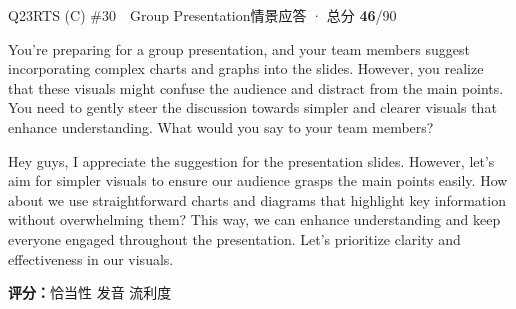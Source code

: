 \begin{qblock}{Q23\quad RTS (C) \#30\ \ Group Presentation}{情景应答 · 总分 \textcolor{cAccent}{\bfseries 46}/90}
\begin{promptbox}
You're preparing for a group presentation, and your team members suggest incorporating complex charts and graphs into the slides. However, you realize that these visuals might confuse the audience and distract from the main points. You need to gently steer the discussion towards simpler and clearer visuals that enhance understanding. What would you say to your team members?
\end{promptbox}
\begin{modelbox}
Hey guys, I appreciate the suggestion for the presentation slides. However, let's aim for simpler visuals to ensure our audience grasps the main points easily. How about we use straightforward charts and diagrams that highlight key information without overwhelming them? This way, we can enhance understanding and keep everyone engaged throughout the presentation. Let's prioritize clarity and effectiveness in our visuals.
\end{modelbox}
\asrlegend
\begin{asrbox}
                                                      
\end{asrbox}
\smallskip
{\small\textbf{评分：}恰当性  \quad\textperiodcentered\quad 发音  \quad\textperiodcentered\quad 流利度 }
\end{qblock}


